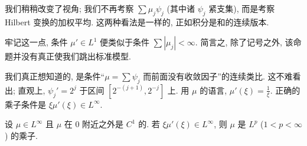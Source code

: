 \begin{remark}\label{rem:4.2}
我们稍稍改变了视角; 我们不再考察 $\sum\mu_j\psi_j$ (其中诸 $\psi_j$ 紧支集), 而是考察 Hilbert 变换的加权平均. 这两种看法是一样的, 正如积分是和的连续版本.

牢记这一点, 条件 $\mu'\in L^1$ 便类似于条件 $\sum|\mu_j|<\infty$. 简言之, 除了记号之外, 该命题并没有真正使我们跳出标准模型.

我们真正想知道的, 是条件``$\mu=\sum\psi_j$ 而前面没有收敛因子''的连续类比. 这不难看出; 直观上, $\psi_j'=2^j$ 于区间 $[2^{-(j+1)},2^{-j}]$ 上. 用 $\mu$ 的语言, $\mu'(\xi)=\frac{1}{\xi}$. 正确的乘子条件是 $\xi\mu'(\xi)\in L^{\infty}$.
\end{remark}

\begin{theorem}\label{thm:4.3}
设 $\mu\in L^{\infty}$ 且 $\mu$ 在 $0$ 附近之外是 $C^{1}$ 的. 若 $\xi\mu'(\xi)\in L^{\infty}$, 则 $\mu$ 是 $L^{p}$ ($1<p<\infty$) 的乘子.
\end{theorem}

